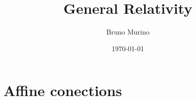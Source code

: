 \documentclass{_mypackages/monograph}
\title{General Relativity} %
\author{Bruno Murino} %
\date{\today} %
\begin{document}
\chapter{Affine conections}
\minitoc
\end{document}
